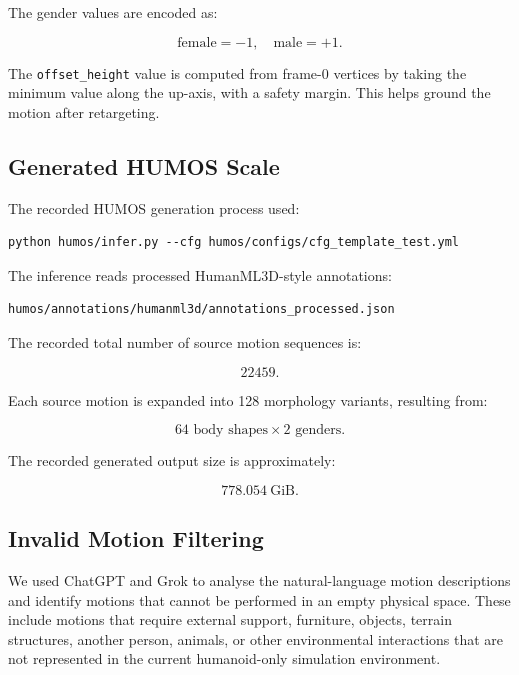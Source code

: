 \documentclass[11pt,a4paper]{article}
\begin{document}
The gender values are encoded as:

\begin{equation}
    \text{female}=-1, \quad \text{male}=+1.
\end{equation}

The \texttt{offset\_height} value is computed from frame-0 vertices by taking the minimum value along the up-axis, with a safety margin. This helps ground the motion after retargeting.

\subsection{Generated HUMOS Scale}

The recorded HUMOS generation process used:

\begin{lstlisting}
python humos/infer.py --cfg humos/configs/cfg_template_test.yml
\end{lstlisting}

The inference reads processed HumanML3D-style annotations:

\begin{lstlisting}
humos/annotations/humanml3d/annotations_processed.json
\end{lstlisting}

The recorded total number of source motion sequences is:

\begin{equation}
    22459.
\end{equation}

Each source motion is expanded into 128 morphology variants, resulting from:

\begin{equation}
    64 \text{ body shapes} \times 2 \text{ genders}.
\end{equation}

The recorded generated output size is approximately:

\begin{equation}
    778.054\ \text{GiB}.
\end{equation}

\subsection{Invalid Motion Filtering}

We used ChatGPT and Grok to analyse the natural-language motion descriptions and identify motions that cannot be performed in an empty physical space. These include motions that require external support, furniture, objects, terrain structures, another person, animals, or other environmental interactions that are not represented in the current humanoid-only simulation environment.
\end{document}

